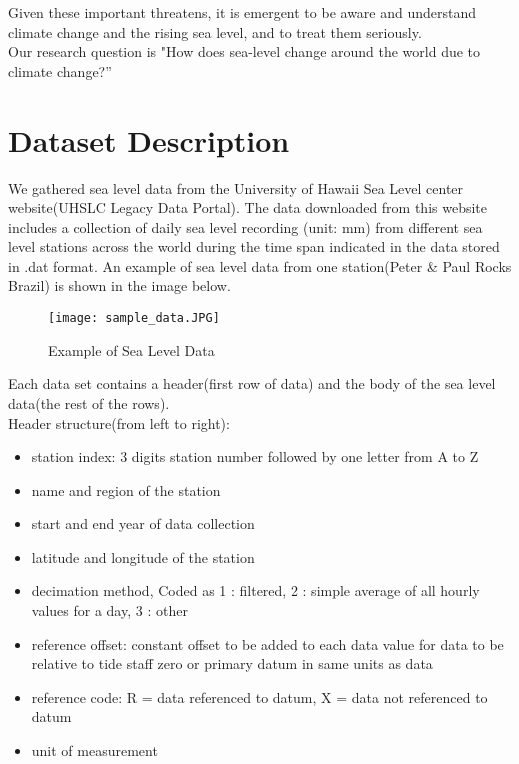 \documentclass[fontsize=11pt]{article}
\begin{document}
Given these important threatens, it is emergent to be aware and understand climate change and the rising sea level, and to treat them seriously.\\

Our research question is "How does sea-level change around the world due to climate change?”

\newpage
\section*{Dataset Description}
We gathered sea level data from the University of Hawaii Sea Level center website(UHSLC Legacy Data Portal). The data downloaded from this website includes a collection of daily sea level recording (unit: mm) from different sea level stations across the world during the time span indicated in the data stored in .dat format. An example of sea level data from one station(Peter \& Paul Rocks Brazil) is shown in the image below.

\begin{figure}[h!]
\centering
\texttt{[image: sample\_data.JPG]}
\caption{Example of Sea Level Data}
\label{fig:sample_data.JPG}
\end{figure}

Each data set contains a header(first row of data) and the body of the sea level data(the rest of the rows).\\ 

Header structure(from left to right):
\begin{itemize}
    \item
    station index: 3 digits station number followed by one letter from A to Z
    \item
    name and region of the station
    \item
    start and end year of data collection
    \item
    latitude and longitude of the station
    \item
    decimation method, Coded as 
    1 : filtered,
    2 : simple average of all hourly values for a day,
    3 : other
    \item
    reference offset: constant offset to be added to each data value for data to be relative to tide staff zero or primary datum in same units as data
    \item
    reference code: R = data referenced to datum,
X = data not referenced to datum
    \item
    unit of measurement
\end{itemize}
\end{document}
